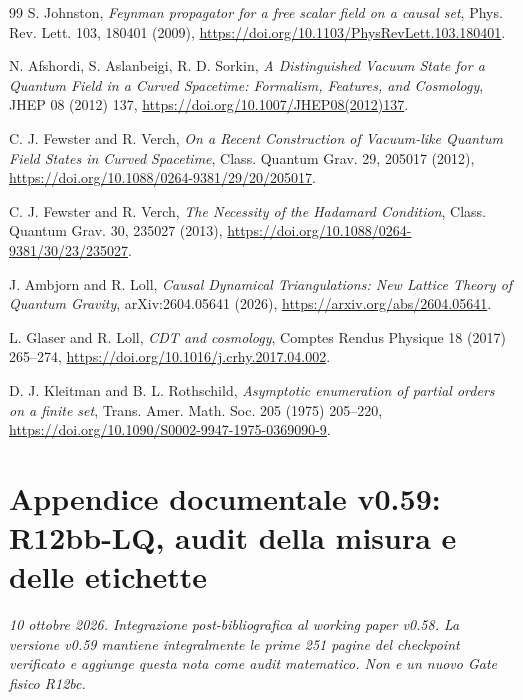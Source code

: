 \documentclass[11pt,a4paper]{article}
\begin{document}
\begin{thebibliography}{99}
S. Johnston, \textit{Feynman propagator for a free scalar field on a causal set},
Phys. Rev. Lett. 103, 180401 (2009),
\url{https://doi.org/10.1103/PhysRevLett.103.180401}.

N. Afshordi, S. Aslanbeigi, R. D. Sorkin,
\textit{A Distinguished Vacuum State for a Quantum Field in a Curved Spacetime: Formalism, Features, and Cosmology},
JHEP 08 (2012) 137, \url{https://doi.org/10.1007/JHEP08(2012)137}.

C. J. Fewster and R. Verch,
\textit{On a Recent Construction of Vacuum-like Quantum Field States in Curved Spacetime},
Class. Quantum Grav. 29, 205017 (2012),
\url{https://doi.org/10.1088/0264-9381/29/20/205017}.

C. J. Fewster and R. Verch,
\textit{The Necessity of the Hadamard Condition},
Class. Quantum Grav. 30, 235027 (2013),
\url{https://doi.org/10.1088/0264-9381/30/23/235027}.

J. Ambjorn and R. Loll, \textit{Causal Dynamical Triangulations: New Lattice Theory of Quantum Gravity},
arXiv:2604.05641 (2026), \url{https://arxiv.org/abs/2604.05641}.

L. Glaser and R. Loll, \textit{CDT and cosmology},
Comptes Rendus Physique 18 (2017) 265--274,
\url{https://doi.org/10.1016/j.crhy.2017.04.002}.

D. J. Kleitman and B. L. Rothschild,
\textit{Asymptotic enumeration of partial orders on a finite set},
Trans. Amer. Math. Soc. 205 (1975) 205--220,
\url{https://doi.org/10.1090/S0002-9947-1975-0369090-9}.

\end{thebibliography}



\clearpage
\section*{Appendice documentale v0.59: R12bb-LQ, audit della misura e delle etichette}
\textit{10 ottobre 2026. Integrazione post-bibliografica al working paper v0.58. La versione v0.59 mantiene integralmente le prime 251 pagine del checkpoint verificato e aggiunge questa nota come audit matematico. Non e un nuovo Gate fisico R12bc.}
\end{document}
